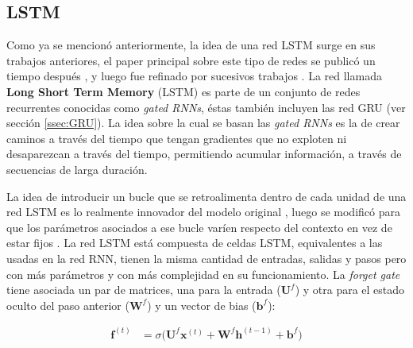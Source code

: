 \documentclass[spanish]{article}
\theoremstyle{definition}
\theoremstyle{remark}
\numberwithin{equation}{section}
\numberwithin{equation}{section} %
\begin{document}
\subsection{LSTM}
\label{ssec:LSTM}
Como ya se mencionó anteriormente, la idea de una red LSTM surge en sus trabajos anteriores, el paper principal sobre este tipo de redes se publicó un tiempo después \cite{hochreiter1997long}, y luego fue refinado por sucesivos trabajos  \cite{gers1999learning}. La red llamada \textbf{Long Short Term Memory} (LSTM) es parte de un conjunto de redes recurrentes conocidas como \textit{gated RNNs}, éstas también incluyen las red GRU (ver sección \ref{ssec:GRU}). La idea sobre la cual se basan las \textit{gated RNNs} es la de crear caminos a través del tiempo que tengan gradientes que no exploten ni desaparezcan a través del tiempo, permitiendo acumular información, a través de secuencias de larga duración.\par
La idea de introducir un bucle que se retroalimenta dentro de cada unidad de una red LSTM es lo realmente innovador del modelo original \cite{hochreiter1997long}, luego se modificó para que los parámetros asociados a ese bucle varíen respecto del contexto en vez de estar fijos \cite{gers1999learning}. La red LSTM está compuesta de celdas LSTM, equivalentes a las usadas en la red RNN, tienen la misma cantidad de entradas, salidas y pasos pero con más parámetros y con más complejidad en su funcionamiento.  La \textit{forget gate} tiene asociada un par de matrices, una para la entrada ($\boldsymbol{U}^f$) y otra para el estado oculto del paso anterior ($\boldsymbol{W}^f$) y un vector de bias ($\boldsymbol{b}^f$):  \par
\begin{equation}
\label{eq_lstm_forget_gate}
\begin{split}
 \boldsymbol{f}^{(t)} &
 = \sigma  \Big( \boldsymbol{U}^f \boldsymbol{x}^{(t)} +  \boldsymbol{W}^f \boldsymbol{h}^{(t-1)}+\boldsymbol{b}^f\Big)\\
 \end{split}
 \end{equation} \par
 
\end{document}
